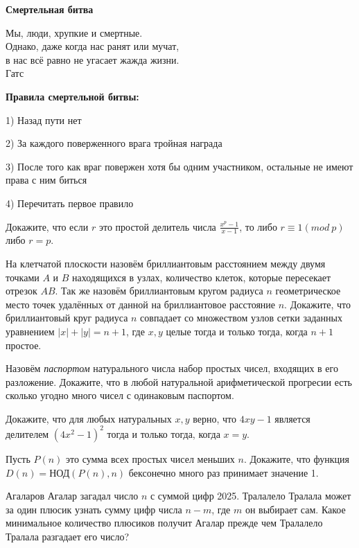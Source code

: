 \centerline{\bf \Huge Смертельная битва}

\begin{flushright}
        \scriptsize{Мы, люди, хрупкие и смертные. \\Однако, даже когда нас ранят или мучат,\\ в нас всё равно не угасает жажда жизни.\\Гатс}
\end{flushright}


\textbf{Правила смертельной битвы:}

1) Назад пути нет

2) За каждого поверженного врага тройная награда

3) После того как враг повержен хотя бы одним участником, остальные не имеют права с ним биться

4) Перечитать первое правило

Докажите, что если $r$ это простой делитель числа $\frac{x^p-1}{x-1}$, то либо $r \equiv 1(mod\  p)$ либо $r=p$.

На клетчатой плоскости назовём бриллиантовым расстоянием между двумя точками $A$ и $B$ находящихся в узлах, количество клеток, которые пересекает отрезок $A B$. Так же назовём бриллиантовым кругом радиуса $n$ геометрическое место точек удалённых от данной на бриллиантовое расстояние $n$. Докажите, что бриллиантовый круг радиуса $n$ совпадает со множеством узлов сетки заданных уравнением $|x|+|y|=n+1$, где $x, y$ целые тогда и только тогда, когда $n+1$ простое.

Назовём \textit{паспортом} натурального числа набор простых чисел, входящих в его разложение. Докажите, что в любой натуральной арифметической прогресии есть сколько угодно много чисел с одинаковым паспортом.

Докажите, что для любых натуральных $x, y$ верно, что $4xy-1$ является делителем $(4x^2-1)^2$ тогда и только тогда, когда $x = y.$

Пусть $P(n)$ это сумма всех простых чисел меньших $n$. Докажите, что функция $D(n) = \text{НОД}(P(n), n)$ бексонечно много раз принимает значение 1.

Агаларов Агалар загадал число $n$ с суммой цифр 2025. Тралалело Тралала может за один плюсик узнать сумму цифр числа $n-m$, где $m$ он выбирает сам. Какое минимальное количество плюсиков получит Агалар прежде чем Тралалело Тралала разгадает его число?